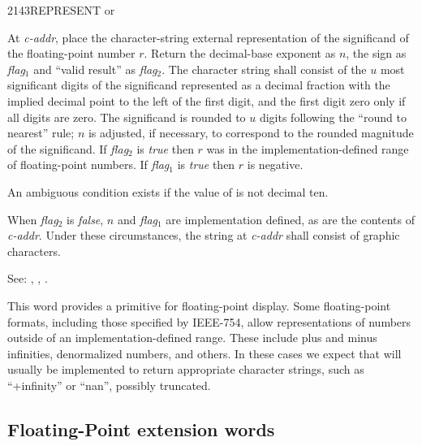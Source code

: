 \begin{newword}{2143}{REPRESENT}
	  or

	At \emph{c-addr}, place the character-string external
	representation of the significand of the floating-point number
	$r$. Return the decimal-base exponent as $n$, the sign as
	\emph{flag}$_1$ and ``valid result'' as \emph{flag}$_2$.
	The character string shall consist of the $u$ most significant
	digits of the significand represented as a decimal fraction with
	the implied decimal point to the left of the first digit, and
	the first digit zero only if all digits are zero. The significand
	is rounded to $u$ digits following the ``round to nearest'' rule;
	$n$ is adjusted, if necessary, to correspond to the rounded
	magnitude of the significand. If \emph{flag}$_2$ is \emph{true}
	then $r$ was in the implementation-defined range of floating-point
	numbers. If \emph{flag}$_1$ is \emph{true} then $r$ is negative.

	An ambiguous condition exists if the value of 
	is not decimal ten.

	When \emph{flag}$_2$ is \emph{false}, $n$ and \emph{flag}$_1$
	are implementation defined, as are the contents of \emph{c-addr}.
	Under these circumstances, the string at \emph{c-addr} shall
	consist of graphic characters.

\item[See:]
	,
	,
	.

	\begin{rationale} %
		This word provides a primitive for floating-point display.
		Some floating-point formats, including those specified by
		IEEE-754, allow representations of numbers outside of an
		implementation-defined range. These include plus and minus
		infinities, denormalized numbers, and others. In these cases
		we expect that  will usually be implemented
		to return appropriate character strings, such as ``+infinity''
		or ``nan'', possibly truncated.
	\end{rationale}
\end{newword}


\subsection{Floating-Point extension words} %
\extended

